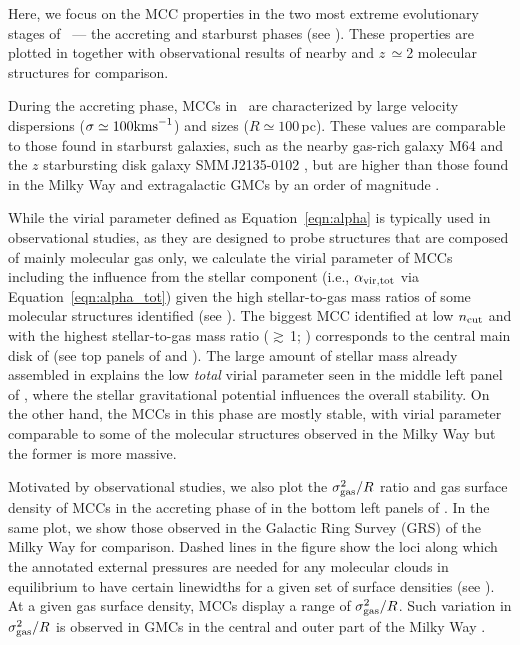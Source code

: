 \IfFileExists{emulateapjlegacy.cls}{\documentclass[iop]{emulateapjlegacy}}{\documentclass[iop]{emulateapj}}
\begin{document}
Here, we focus on the MCC properties in the two most extreme evolutionary stages of \flower\ --- the accreting and starburst phases (see ). 
These properties are plotted in  together with observational results of nearby and $z$\,$\simeq$2 molecular structures for comparison.

During the accreting phase, MCCs in \flower\ are characterized by large velocity dispersions ($\sigma \simeq 100 {\rm km s}^{-1}$) and sizes ($R\simeq 100$\,pc). These values are comparable to those found in starburst galaxies, such as the nearby gas-rich galaxy M64 and the $z$ starbursting disk galaxy SMM\,J2135-0102 \citep{Rosolowsky05a, Swinbank11a}, but are higher than those found in the Milky Way and extragalactic GMCs by an order of magnitude \citep{Heyer04a, Bolatto08a}.

While the virial parameter defined as Equation~\ref{eqn:alpha} is typically used in observational studies, as they are designed to probe structures that are composed of mainly molecular gas only, we calculate the virial parameter of MCCs including the influence from the stellar component (i.e., $\alpha_{\rm vir, tot}$ via Equation~\ref{eqn:alpha_tot}) given the high stellar-to-gas mass ratios of some molecular structures identified (see ).
% 
The biggest MCC identified at low $n_{\rm cut}$ and with the highest stellar-to-gas mass ratio ($\gtrsim$\,1; ) corresponds to the central main 
disk of \flower (see top panels of  and ). The large amount of stellar mass already assembled in \flower
explains the low {\em total} virial parameter seen in the middle left panel of , where the stellar gravitational potential 
influences the overall stability. On the other hand, the MCCs in this phase are mostly stable, with 
virial parameter comparable to some of the molecular structures observed in the Milky Way but the former is more massive.

Motivated by observational studies, we also plot the $\sigma_{\rm gas}^2/R$ ratio and gas surface density of MCCs in the accreting phase of \flower in the bottom left panels of . In the same plot, we show those observed in the Galactic Ring Survey (GRS) of the Milky Way \citep{Heyer09a} for comparison. Dashed lines in the figure show the loci along which the annotated external pressures are needed for any molecular clouds in equilibrium to have certain linewidths for a given set of surface densities (see ). 
At a given gas surface density, MCCs display a range of $\sigma_{\rm gas}^2/R$. 
Such variation in $\sigma_{\rm gas}^2/R$ is observed in GMCs in the central and outer part of the Milky Way \citep{Oka01a, Heyer09a}.
\end{document}
